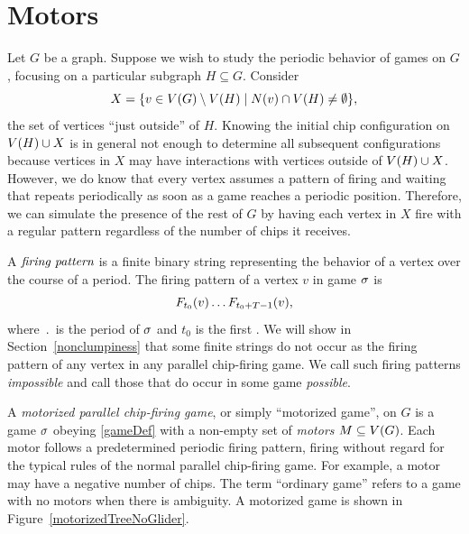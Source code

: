 \section{Motors}\label{motors}

Let $G$ be a graph. Suppose we wish to study the periodic behavior of games on
$G$, focusing on a particular subgraph $H \subseteq G$. Consider
\begin{equation*}
  X = \set{v \in \V \setminus \V[H]}{\N{v} \cap \V[H] \neq \emptyset},
\end{equation*}
the set of vertices ``just outside'' of $H$. Knowing the initial chip
configuration on $\V[H] \cup X$ is in general not enough to determine all
subsequent configurations because vertices in $X$ may have interactions with
vertices outside of $\V[H] \cup X$. However, we do know that every vertex
assumes a pattern of firing and waiting that repeats periodically as soon as a
game reaches a periodic position. Therefore, we can simulate the presence of
the rest of $G$ by having each vertex in $X$ fire with a regular pattern
regardless of the number of chips it receives.

A $\emph{firing pattern}$ is a finite binary string representing the behavior
of a vertex over the course of a period. The firing pattern of a vertex $v$ in
game $\s$ is
\[
  \firing{v}{t_0}\dots\firing{v}{t_0 + \period - 1},
\]
where $\period$ is the period of $\s$ and $t_0$ is the first . We will show in
Section~\ref{nonclumpiness} that some finite strings do not occur as the firing
pattern of any vertex in any parallel chip-firing game. We call such firing
patterns \emph{impossible} and call those that do occur in some game
\emph{possible}.

A \emph{motorized parallel chip-firing game},
or simply ``motorized game'', on $G$ is a game $\s$ obeying \eqref{gameDef}
with a non-empty set of \emph{motors} $\mots \subseteq \V$. Each motor follows
a predetermined periodic firing pattern, firing without regard for the typical
rules of the normal parallel chip-firing game. For example, a motor may have
a negative number of chips. The term ``ordinary game'' refers to a game with no
motors when there is ambiguity. A motorized game is shown in
Figure~\ref{motorizedTreeNoGlider}.

